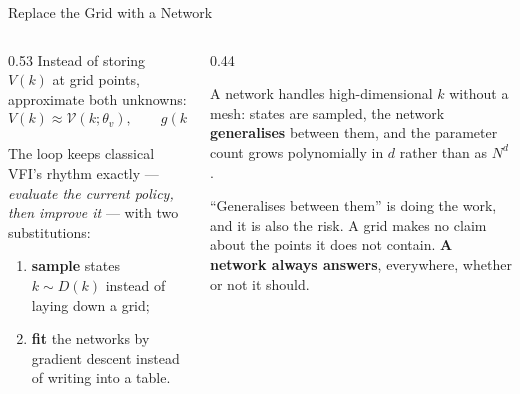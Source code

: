 \begin{frame}{Replace the Grid with a Network}
\begin{columns}[T]
\begin{column}{0.53\textwidth}
\small
Instead of storing $V(k)$ at grid points, approximate both unknowns:
\[
  V(k)\approx\mathcal{V}(k;\theta_v),\qquad g(k)\approx\mathcal{G}(k;\theta_g).
\]
\medskip

The loop keeps classical VFI's rhythm exactly --- \emph{evaluate the current policy, then improve it} --- with two substitutions:
\begin{enumerate}\small\setlength{\itemsep}{0.9mm}
  \item \textbf{sample} states $k\sim D(k)$ instead of laying down a grid;
  \item \textbf{fit} the networks by gradient descent instead of writing into a table.
\end{enumerate}
\end{column}
\begin{column}{0.44\textwidth}
\begin{takeawaybox}[title=\textbf{Why it scales}]\small
A network handles high-dimensional $k$ without a mesh: states are sampled, the network \textbf{generalises} between them, and the parameter count grows polynomially in $d$ rather than as $N^{d}$.
\end{takeawaybox}
\medskip
\begin{examplebox}\footnotesize
``Generalises between them'' is doing the work, and it is also the risk. A grid makes no claim about the points it does not contain. \textbf{A network always answers}, everywhere, whether or not it should.
\end{examplebox}
\end{column}
\end{columns}
\end{frame}

